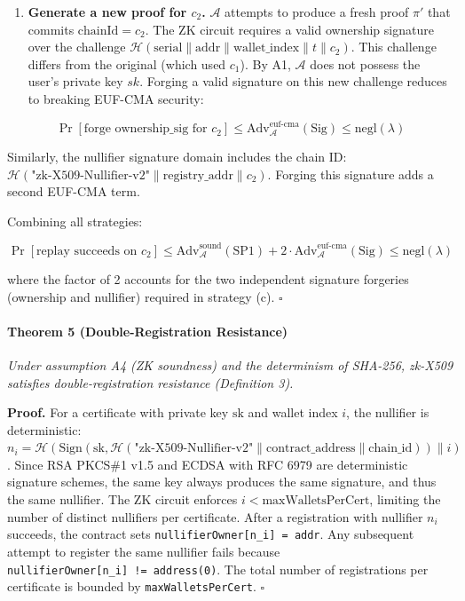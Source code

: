 \documentclass[11pt, a4paper]{article}
\providecommand{\tightlist}{%
  \setlength{\itemsep}{0pt}\setlength{\parskip}{0pt}}
\begin{document}
\begin{enumerate}
\def\labelenumi{(\alph{enumi})}
\setcounter{enumi}{2}
\tightlist
\item
  \textbf{Generate a new proof for \(c_2\).} \(\mathcal{A}\) attempts to
  produce a fresh proof \(\pi'\) that commits \(\text{chainId} = c_2\).
  The ZK circuit requires a valid ownership signature over the challenge
  \(\mathcal{H}(\text{serial} \| \text{addr} \| \text{wallet\_index} \| t \| c_2)\).
  This challenge differs from the original (which used \(c_1\)). By A1,
  \(\mathcal{A}\) does not possess the user's private key \(sk\).
  Forging a valid signature on this new challenge reduces to breaking
  EUF-CMA security:
\end{enumerate}

\[\Pr[\text{forge ownership\_sig for } c_2] \leq \text{Adv}_{\mathcal{A}}^{\text{euf-cma}}(\text{Sig}) \leq \text{negl}(\lambda)\]

Similarly, the nullifier signature domain includes the chain ID:
\(\mathcal{H}(\text{"zk-X509-Nullifier-v2"} \| \text{registry\_addr} \| c_2)\).
Forging this signature adds a second EUF-CMA term.

Combining all strategies:

\[\Pr[\text{replay succeeds on } c_2] \leq \text{Adv}_{\mathcal{A}}^{\text{sound}}(\text{SP1}) + 2 \cdot \text{Adv}_{\mathcal{A}}^{\text{euf-cma}}(\text{Sig}) \leq \text{negl}(\lambda)\]

where the factor of 2 accounts for the two independent signature
forgeries (ownership and nullifier) required in strategy (c).
\(\square\)

\paragraph{Theorem 5 (Double-Registration
Resistance)}\label{theorem-3-double-registration-resistance}

\emph{Under assumption A4 (ZK soundness) and the determinism of SHA-256,
zk-X509 satisfies double-registration resistance (Definition 3).}

\textbf{Proof.} For a certificate with private key \(\text{sk}\) and
wallet index \(i\), the nullifier is deterministic:
\(n_i = \mathcal{H}(\text{Sign}(\text{sk}, \mathcal{H}(\text{"zk-X509-Nullifier-v2"} \| \text{contract\_address} \| \text{chain\_id})) \| i)\).
Since RSA PKCS\#1 v1.5 and ECDSA with RFC 6979 are deterministic
signature schemes, the same key always produces the same signature, and
thus the same nullifier. The ZK circuit enforces
\(i < \text{maxWalletsPerCert}\), limiting the number of distinct
nullifiers per certificate. After a registration with nullifier \(n_i\)
succeeds, the contract sets \texttt{nullifierOwner{[}n\_i{]}\ =\ addr}.
Any subsequent attempt to register the same nullifier fails because
\texttt{nullifierOwner{[}n\_i{]}\ !=\ address(0)}. The total number of
registrations per certificate is bounded by \texttt{maxWalletsPerCert}.
\(\square\)
\end{document}

